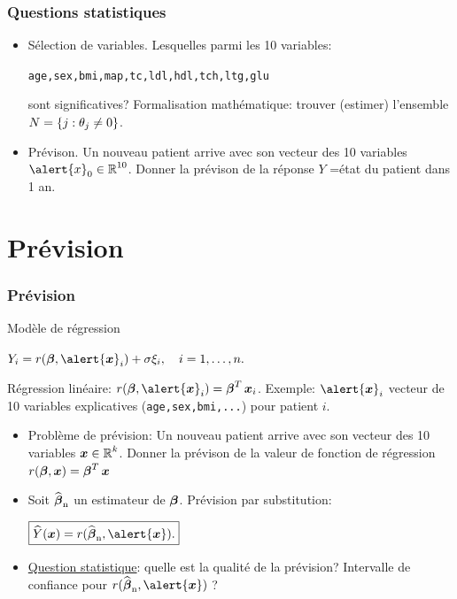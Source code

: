 \begin{frame}
\frametitle{Questions statistiques}
\begin{itemize}
\item \alert{Sélection de variables.} Lesquelles parmi les 10
variables:\\\vspace{3mm}
\centerline{\texttt{age,sex,bmi,map,tc,ldl,hdl,tch,ltg,glu}}\vspace{3mm}
sont significatives? Formalisation mathématique: trouver (estimer)
l'ensemble $N= \{j: \theta_{j}\ne 0\}$.
\item \alert{Prévison.} Un nouveau patient arrive avec son vecteur
des 10 variables $\alert{x}_0\in \R^{10}$. Donner la prévison de la
réponse $Y$ =état du patient dans 1 an.
\end{itemize}
\end{frame}



\section{Prévision}

\begin{frame}
\frametitle{Prévision}

Modèle de régression \vspace{2mm} \centerline{$ Y_i=
r(\truebeta, \alert{\bx}_i)+ \sigma \xi_i, \quad i=1,\dots,n.$}
Régression
\alert{linéaire}: $r(\truebeta, \alert{\bx}_i)=\truebeta^T
\bx_i$.
Exemple: $\alert{\bx}_i$ vecteur de 10 variables explicatives
(\texttt{age,sex,bmi,...}) pour patient $i$.
\begin{itemize}
\item \alert{Problème de prévision}:
Un nouveau patient arrive avec son vecteur des 10 variables $
\operatorname{\boldsymbol{x}} \in \operatorname{{\mathbb R}}^{k}$. Donner la prévison de la valeur de fonction de
régression $r(\boldsymbol{\beta},  \operatorname{\boldsymbol{x}})=\boldsymbol{\beta}^T \operatorname{\boldsymbol{x}}$\\
\item Soit $\operatorname{\widehat{\boldsymbol{\beta}}_n}$ un estimateur de $\boldsymbol{\beta}$. \alert{Prévision par
substitution:}
 \centerline{$\boxed{ \widehat Y(\bx) = r(\estregress, \alert{\bx}).}$}
\item \underline{Question statistique}: quelle est la qualité de la prévision?
\alert{Intervalle de confiance} pour $r(\estregress, \alert{\bx})$ ?
\end{itemize}
\end{frame}



